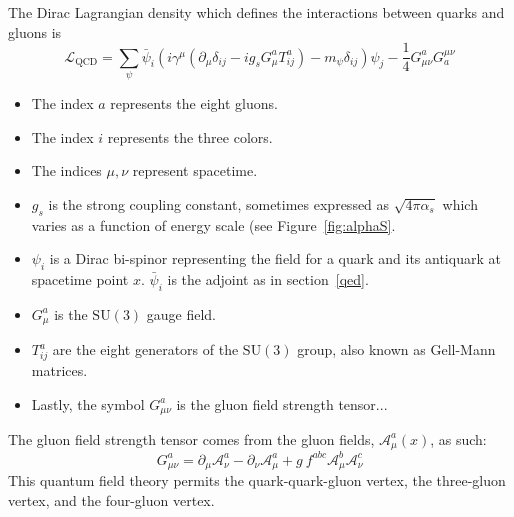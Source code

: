 The Dirac Lagrangian density which defines the interactions between quarks and gluons is
\begin{equation}
\mathcal{L}_\mathrm{QCD} = \sum_{\psi} \bar{\psi}_i \left( i \gamma^\mu ( \partial_\mu \delta_{ij} - i g_s G^a_\mu T^a_{ij}) - m_\psi \delta_{ij} \right) \psi_j - \frac{1}{4} G^a_{\mu\nu} G^{\mu\nu}_a
\end{equation}


\begin{itemize}
  \setlength\itemsep{0em}
  \item The index $a$ represents the eight gluons.
  \item The index $i$ represents the three colors.
  \item The indices $\mu,\nu$ represent spacetime.
  \item $g_s$ is the strong coupling constant, sometimes expressed as $\sqrt{4\pi\alpha_s}$ which varies as a function of energy scale (see Figure~\ref{fig:alphaS}.
  \item $\psi_i$ is a Dirac bi-spinor representing the field for a quark and its antiquark at spacetime point $x$. $\bar{\psi}_i$ is the adjoint as in section~\ref{qed}.
  \item $G^a_\mu$ is the $\mathrm{SU}(3)$ gauge field.
  \item $T^a_{ij}$ are the eight generators of the $\mathrm{SU}(3)$ group, also known as Gell-Mann matrices.
  \item Lastly, the symbol $G^a_{\mu\nu}$ is the gluon field strength tensor...
\end{itemize}
The gluon field strength tensor comes from the gluon fields, $\mathcal{A}^a_\mu(x)$, as such:
\begin{equation}
G^a_{\mu\nu} = \partial_\mu \mathcal{A}^a_\nu - \partial_\nu \mathcal{A}^a_\mu + g\:f^{abc} \mathcal{A}^b_\mu \mathcal{A}^c_\nu
\end{equation}
This quantum field theory permits the quark-quark-gluon vertex, the three-gluon vertex, and the four-gluon vertex.
